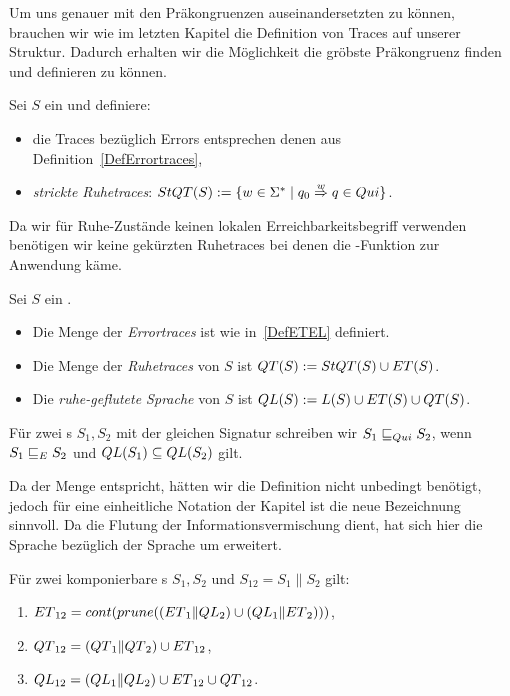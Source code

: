 Um uns genauer mit den Präkongruenzen auseinandersetzten zu können, brauchen
wir wie im letzten Kapitel die Definition von Traces auf unserer Struktur.
Dadurch erhalten wir die Möglichkeit die gröbste Präkongruenz finden und
definieren zu können.

\begin{Def}
  \label{DefRuhetraces}
  Sei $S$ ein \EIO{} und definiere:
  \begin{itemize}
    \item die Traces bezüglich Errors entsprechen denen
      aus Definition~\ref{DefErrortraces},
    \item \emph{strickte Ruhetraces}: $StQT{}(S) := \{w\in\Sigma ^*\mid q_0
      \overset{w}{\Rightarrow} q\in Qui\}$.
  \end{itemize}
\end{Def}

Da wir für Ruhe-Zustände keinen lokalen Erreichbarkeitsbegriff verwenden benötigen
wir keine gekürzten Ruhetraces bei denen die \prune{}-Funktion zur
Anwendung käme.

\begin{Def}
  \label{DefQTQL}
  Sei $S$ ein \EIO{}.
  \begin{itemize}
    \item Die Menge der \emph{Errortraces} ist wie in~\ref{DefETEL} definiert.
    \item Die Menge der \emph{Ruhetraces} von $S$ ist $QT{}(S) :=
      StQT{}(S)\cup ET{}(S)$.
    \item Die \emph{ruhe-geflutete Sprache} von $S$ ist
      $QL{}(S):=L(S)\cup ET{}(S)\cup QT{}(S)$.
  \end{itemize}
  Für zwei \EIO{}s $S_1, S_2$ mit der gleichen Signatur schreiben wir
  $S_1\sqsubseteq _{Qui} S_2$, wenn $S_1\sqsubseteq _E S_2$ und $QL{}(S_1)\subseteq QL{}(S_2)$ gilt.
\end{Def}

Da \QT{} der Menge \StQT{} entspricht, hätten wir die Definition nicht
unbedingt benötigt, jedoch für eine einheitliche Notation der Kapitel ist die
neue Bezeichnung sinnvoll. Da die Flutung der Informationsvermischung dient,
hat sich hier die Sprache \QL{} bezüglich der Sprache \EL{} um \QT{} erweitert.\\

\begin{satz}
  \label{satzQuiSemantik}
  Für zwei komponierbare \EIO{}s $S_1, S_2$ und $S_{12} = S_1\|S_2$ gilt:
  \begin{enumerate}
    \item $ET{}_{12} = cont{}(prune{}((ET{}_1\|QL{}_2)\cup (QL{}_1\|ET{}_2)))$,
    \item $QT{}_{12} = (QT{}_1\|QT{}_2)\cup ET{}_{12}$,
    \item $QL{}_{12} = (QL{}_1\|QL{}_2)\cup ET{}_{12}\cup QT{}_{12}$.
  \end{enumerate}
\end{satz}


